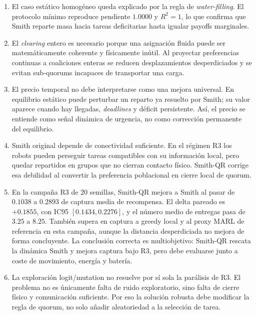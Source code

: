 \begin{enumerate}
  \item El caso estático homogéneo queda explicado por la regla de
  \emph{water-filling}. El protocolo mínimo reproduce pendiente $1.0000$ y $R^2=1$,
  lo que confirma que Smith reparte masa hacia tareas deficitarias hasta igualar payoffs
  marginales.

  \item El \emph{clearing} entero es necesario porque una asignación fluida puede ser
  matemáticamente coherente y físicamente inútil. Al proyectar preferencias continuas a
  coaliciones enteras se reducen desplazamientos desperdiciados y se evitan sub-quorums
  incapaces de transportar una carga.

  \item El precio temporal no debe interpretarse como una mejora universal. En equilibrio
  estático puede perturbar un reparto ya resuelto por Smith; su valor aparece cuando hay
  llegadas, \emph{deadlines} y déficit persistente. Así, el precio se entiende como señal
  dinámica de urgencia, no como corrección permanente del equilibrio.

  \item Smith original depende de conectividad suficiente. En el régimen R3 los robots
  pueden perseguir tareas compatibles con su información local, pero quedar repartidos en
  grupos que no cierran contacto físico. Smith-QR corrige esa debilidad al convertir la
  preferencia poblacional en cierre local de quorum.

  \item En la campaña R3 de 20 semillas, Smith-QR mejora a Smith al pasar de $0.1038$ a
  $0.2893$ de captura media de recompensa. El delta pareado es $+0.1855$, con IC95
  $[0.1434,0.2276]$, y el número medio de entregas pasa de $3.25$ a $8.25$. También
  supera en captura a greedy local y al proxy MARL de referencia en esta campaña, aunque la distancia
  desperdiciada no mejora de forma concluyente. La conclusión correcta es multiobjetivo:
  Smith-QR rescata la dinámica Smith y mejora captura bajo R3, pero debe evaluarse junto
  a coste de movimiento, energía y batería.

  \item La exploración logit/mutation no resuelve por sí sola la parálisis de R3. El
  problema no es únicamente falta de ruido exploratorio, sino falta de cierre físico y
  comunicación suficiente. Por eso la solución robusta debe modificar la regla de quorum,
  no solo añadir aleatoriedad a la selección de tarea.


\end{enumerate}
